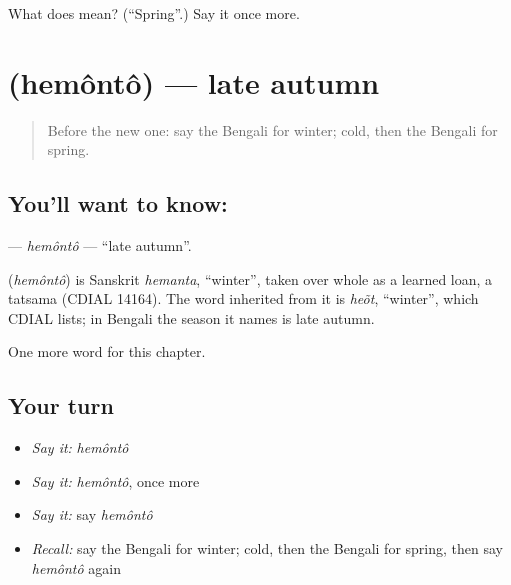 \begin{tcolorbox}[breakable,colback=teal!4,colframe=teal!35!black,title={Before you move on}]
What does  mean? (\textquotedblleft{}Spring\textquotedblright{}.) Say it once more.
\end{tcolorbox}
\section[\texorpdfstring{\bn{হেমন্ত} (hemôntô)}{হেমন্ত (hemôntô)}]{ (hemôntô) — late autumn}

\label{lesson:BN-C93-hemonto}



\begin{quote}
Before the new one: say the Bengali for winter; cold, then the Bengali for spring.
\end{quote}

\subsection*{You'll want to know: }
\textbf{} — \emph{hemôntô} — \textquotedblleft{}late autumn\textquotedblright{}.

\begin{cousinweb}
\textbf{} (\emph{hemôntô}) is Sanskrit \emph{hemanta}, \textquotedblleft{}winter\textquotedblright{}, taken over whole as a learned loan, a tatsama (CDIAL 14164). The word inherited from it is \emph{heõt}, \textquotedblleft{}winter\textquotedblright{}, which CDIAL lists; in Bengali the season it names is late autumn.
\end{cousinweb}

\begin{grammarlens}[title={What you've built}]
One more word for this chapter.
\end{grammarlens}

\subsection*{Your turn}
\begin{itemize}
\raggedright
  \item \emph{Say it:} \emph{hemôntô}
  \item \emph{Say it:} \emph{hemôntô}, once more
  \item \emph{Say it:} say \emph{hemôntô}
  \item \emph{Recall:} say the Bengali for winter; cold, then the Bengali for spring, then say \emph{hemôntô} again
\end{itemize}

